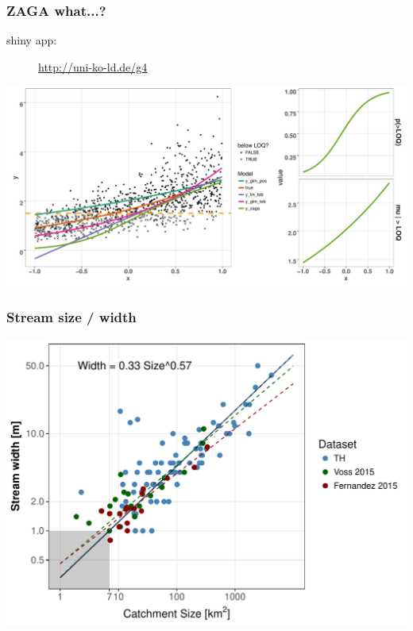 \documentclass[
	10pt
	]{beamer}
\begin{document}
\begin{frame}
\frametitle{ZAGA what...?}
	\begin{description}
		\item[shiny app: ]{\url{http://uni-ko-ld.de/g4}}
	\end{description}
	\includegraphics[width=1.1\textwidth]{figs/zaga_mods.pdf}
\end{frame}


\begin{frame}
\frametitle{Stream size / width}
	  \includegraphics[width=\textwidth]{figs/width_size.pdf}
\end{frame}
\end{document}
